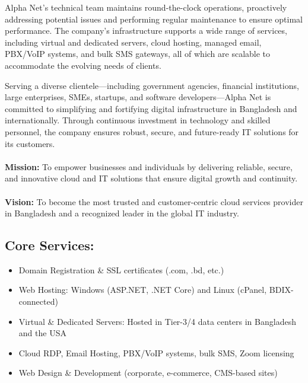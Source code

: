 Alpha Net's technical team maintains round-the-clock operations, proactively addressing potential issues and performing regular maintenance to ensure optimal performance. The company's infrastructure supports a wide range of services, including virtual and dedicated servers, cloud hosting, managed email, PBX/VoIP systems, and bulk SMS gateways, all of which are scalable to accommodate the evolving needs of clients.

Serving a diverse clientele—including government agencies, financial institutions, large enterprises, SMEs, startups, and software developers—Alpha Net is committed to simplifying and fortifying digital infrastructure in Bangladesh and internationally. Through continuous investment in technology and skilled personnel, the company ensures robust, secure, and future-ready IT solutions for its customers.
\\\\
\noindent\textbf{Mission:}
To empower businesses and individuals by delivering reliable, secure, and innovative cloud and IT solutions that ensure digital growth and continuity.
\\\\
\noindent\textbf{Vision:}
To become the most trusted and customer-centric cloud services provider in Bangladesh and a recognized leader in the global IT industry.


\subsection{Core Services:}
\begin{itemize}
    \item Domain Registration \& SSL certificates (.com, .bd, etc.)
    \item Web Hosting: Windows (ASP.NET, .NET Core) and Linux (cPanel, BDIX-connected)
    \item Virtual \& Dedicated Servers: Hosted in Tier-3/4 data centers in Bangladesh and the USA
    \item Cloud RDP, Email Hosting, PBX/VoIP systems, bulk SMS, Zoom licensing
    \item Web Design \& Development (corporate, e-commerce, CMS-based sites)
\end{itemize}


